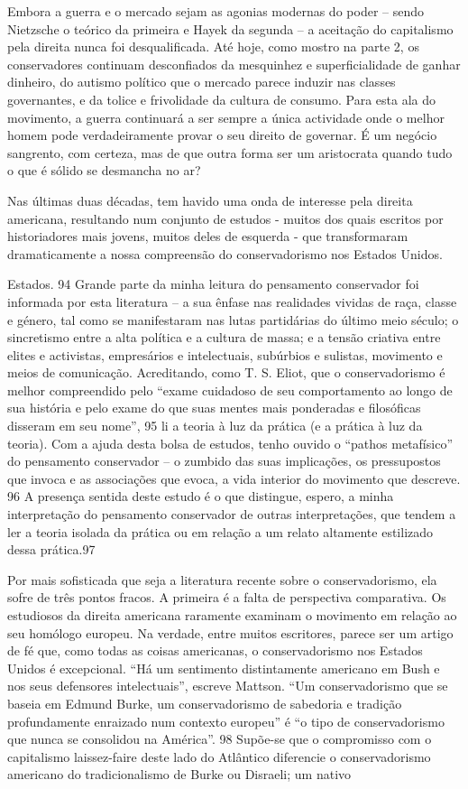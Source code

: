  \par 
Embora a guerra e o mercado sejam as agonias modernas do poder – sendo Nietzsche o teórico da primeira e Hayek da segunda – a aceitação do capitalismo pela direita nunca foi desqualificada. Até hoje, como mostro na parte 2, os conservadores continuam desconfiados da mesquinhez e superficialidade de ganhar dinheiro, do autismo político que o mercado parece induzir nas classes governantes, e da tolice e frivolidade da cultura de consumo. Para esta ala do movimento, a guerra continuará a ser sempre a única actividade onde o melhor homem pode verdadeiramente provar o seu direito de governar. É um negócio sangrento, com certeza, mas de que outra forma ser um aristocrata quando tudo o que é sólido se desmancha no ar?
 \par 
Nas últimas duas décadas, tem havido uma onda de interesse pela direita americana, resultando num conjunto de estudos - muitos dos quais escritos por historiadores mais jovens, muitos deles de esquerda - que transformaram dramaticamente a nossa compreensão do conservadorismo nos Estados Unidos.
 \par 
Estados. {\color{blue}94} Grande parte da minha leitura do pensamento conservador foi informada por esta literatura – a sua ênfase nas realidades vividas de raça, classe e género, tal como se manifestaram nas lutas partidárias do último meio século; o sincretismo entre a alta política e a cultura de massa; e a tensão criativa entre elites e activistas, empresários e intelectuais, subúrbios e sulistas, movimento e meios de comunicação. Acreditando, como T. S. Eliot, que o conservadorismo é melhor compreendido pelo “exame cuidadoso de seu comportamento ao longo de sua história e pelo exame do que suas mentes mais ponderadas e filosóficas disseram em seu nome”, {\color{blue}95} li a teoria à luz da prática (e a prática à luz da teoria). Com a ajuda desta bolsa de estudos, tenho ouvido o “pathos metafísico” do pensamento conservador – o zumbido das suas implicações, os pressupostos que invoca e as associações que evoca, a vida interior do movimento que descreve. {\color{blue}96} A presença sentida deste estudo é o que distingue, espero, a minha interpretação do pensamento conservador de outras interpretações, que tendem a ler a teoria isolada da prática ou em relação a um relato altamente estilizado dessa prática.{\color{blue}97}
 \par 
Por mais sofisticada que seja a literatura recente sobre o conservadorismo, ela sofre de três pontos fracos. A primeira é a falta de perspectiva comparativa. Os estudiosos da direita americana raramente examinam o movimento em relação ao seu homólogo europeu. Na verdade, entre muitos escritores, parece ser um artigo de fé que, como todas as coisas americanas, o conservadorismo nos Estados Unidos é excepcional. “Há um sentimento distintamente americano em Bush e nos seus defensores intelectuais”, escreve Mattson. “Um conservadorismo que se baseia em Edmund Burke, um conservadorismo de sabedoria e tradição profundamente enraizado num contexto europeu” é “o tipo de conservadorismo que nunca se consolidou na América”. {\color{blue}98} Supõe-se que o compromisso com o capitalismo laissez-faire deste lado do Atlântico diferencie o conservadorismo americano do tradicionalismo de Burke ou Disraeli; um nativo
